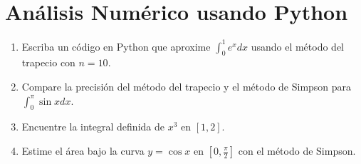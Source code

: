 \section{Análisis Numérico usando Python}

\begin{enumerate}
    \item Escriba un código en Python que aproxime \( \int_{0}^{1} e^x dx \) usando el método del trapecio con \( n = 10 \).
\end{enumerate}

\begin{enumerate}
    \setcounter{enumi}{1}
    \item Compare la precisión del método del trapecio y el método de Simpson para \( \int_{0}^{\pi} \sin x dx \).
\end{enumerate}

\begin{enumerate}
    \setcounter{enumi}{2}
    \item Encuentre la integral definida de \( x^3 \) en \([1,2]\).
\end{enumerate}

\begin{enumerate}
    \setcounter{enumi}{3}
    \item Estime el área bajo la curva \( y = \cos x \) en \([0, \frac{\pi}{2}]\) con el método de Simpson.
\end{enumerate}
